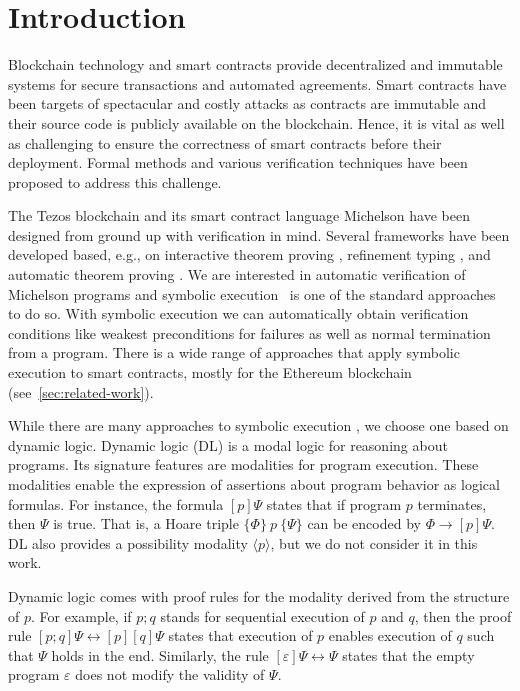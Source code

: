 \section{Introduction}
\label{sec:introduction}

Blockchain technology and smart contracts provide decentralized and
immutable systems for secure transactions and automated agreements.
Smart contracts have been targets of spectacular and costly attacks as
contracts are immutable and their source code is publicly available on
the blockchain. 
Hence, it is vital as well as challenging to ensure the correctness of smart contracts
before their deployment. Formal methods and various verification
techniques have been proposed to address this challenge.

The Tezos blockchain \cite{tezos-whitepaper} and its smart contract
language Michelson have been designed from
ground up with verification in mind. Several frameworks have been
developed based, e.g., on interactive theorem proving \cite{micho},
refinement typing \cite{helmholtz}, and automatic theorem
proving \cite{WHYtool}. 
We are interested in automatic verification of Michelson programs and
symbolic execution~\cite{DBLP:journals/cacm/King76} is one of the
standard approaches to do so. With symbolic execution we can automatically obtain verification
conditions like weakest preconditions for failures as well as normal
termination from a program. There is a wide range of approaches that 
apply symbolic execution to smart contracts, mostly for the Ethereum
blockchain (see~\autoref{sec:related-work}). 

While there are many approaches to symbolic execution
\cite{DBLP:conf/osdi/CadarDE08,DBLP:conf/icse/CsallnerTS08,Pasareanu2020},
we choose one based on dynamic logic.
Dynamic logic (DL) \cite{DL} is a modal logic for reasoning about
programs. Its signature features are modalities for program
execution. These modalities enable the expression of assertions about
program behavior as logical formulas. For instance, the formula $[p]
\Psi$ states that if program $p$ terminates, then $\Psi$ is true. That
is, a Hoare triple $\{\Phi\}~p~\{ \Psi\}$ can be
encoded by $\Phi \to [p]\Psi$. DL also provides a possibility modality
$\langle p\rangle$, but we do not consider it in this work.

Dynamic logic comes with proof rules for the modality derived from the
structure of $p$. For example, if $p;q$ stands for sequential 
execution of $p$ and $q$, then the proof rule $[p;q]\Psi
\leftrightarrow [p][q]\Psi$ states that execution of $p$ enables
execution of $q$ such that $\Psi$ holds in the end. Similarly, the
rule $[\varepsilon]\Psi \leftrightarrow \Psi$ states that the empty
program $\varepsilon$ does not modify the validity of $\Psi$.

